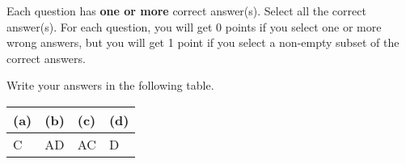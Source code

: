 
Each question has \textbf{one or more} correct answer(s). Select all the correct answer(s). For each question, you will get 0 points if you select one or more wrong answers, but you will get 1 point if you select a non-empty subset of the correct answers.

Write your answers in the following table.


\begin{table}[htbp]
	\centering
	\begin{tabular}{|p{2cm}|p{2cm}|p{2cm}|p{2cm}|}
		\hline 
		(a) & (b) & (c) & (d) \\
		\hline
		C & AD & AC & D \\
		\hline
	\end{tabular} 
\end{table}

